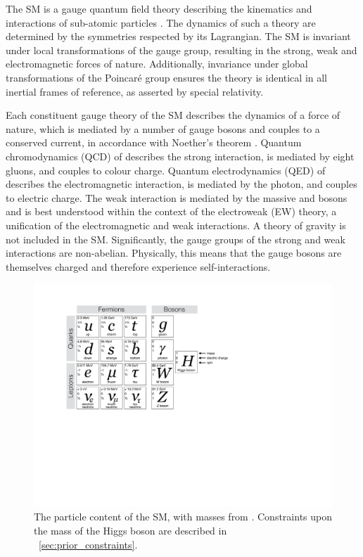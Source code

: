 
The SM is a gauge quantum field theory describing the kinematics and interactions of 
sub-atomic particles 
\cite{Aitchison,Peskin,Glashow:1961,Weinberg:1967,Salam:1968,'tHooft:1972}. 
The dynamics of such a theory are determined 
by the symmetries respected by its Lagrangian. The SM is invariant under local 
transformations of the \SMgroup gauge group, resulting in the strong, weak and 
electromagnetic forces of nature. Additionally, invariance under global transformations of 
the Poincaré group ensures the theory is identical in all inertial frames of reference, as 
asserted by special relativity.

Each constituent gauge theory of the SM describes the dynamics of a force of nature, 
which is mediated by a number of gauge bosons and couples to a conserved current, in 
accordance with Noether's theorem \cite{Noether:1918}. Quantum chromodynamics (QCD) of 
 describes the strong interaction, is mediated by eight gluons, and couples to 
colour charge. Quantum electrodynamics (QED) of  describes the electromagnetic 
interaction, is mediated by the photon, and couples to electric charge. The weak 
interaction is mediated by the massive \PWpm and \PZ bosons and is best understood within 
the context of the electroweak (EW) theory, a unification of the electromagnetic and weak 
interactions. A theory of gravity is not included in the SM. Significantly, the gauge 
groups of the strong and weak interactions are non-abelian. Physically, this means that 
the gauge bosons are themselves charged and therefore experience self-interactions.

\begin{figure}[t]
	\includegraphics[width=\largefigwidth,clip=true,trim=3.9cm 11.8cm 12.6cm 2.6cm]{custom_images/sm_particles}
	\caption{The particle content of the SM, with masses from \cite{PDG:2012}. 
	Constraints upon the mass of the Higgs boson are described in 
	\Section~\ref{sec:prior_constraints}.}
	\label{fig:sm_particles}
\end{figure}

